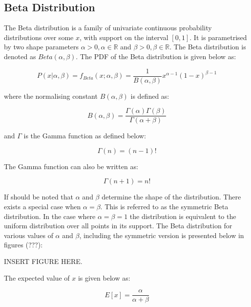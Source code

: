 \subsection{Beta Distribution}
\label{sec:probability:probability_distributions:beta}

The Beta distribution is a family of univariate continuous probability distributions over some $x$, with support on the interval $[0,1]$. It is parametrised by two shape parameters $\alpha > 0, \alpha \in \mathbb{R}$ and $\beta > 0, \beta \in \mathbb{R}$. The Beta distribution is denoted as $Beta(\alpha, \beta)$. The  PDF of the Beta distribution is given below as:

\begin{equation}
P(x | \alpha, \beta) = f_{Beta}(x; \alpha, \beta) = \frac{1}{B(\alpha, \beta)} x^{\alpha - 1} (1 - x)^{\beta - 1}
\end{equation}

where the normalising  constant $B(\alpha, \beta)$ is defined as:

\begin{equation}
B(\alpha, \beta) = \frac{\Gamma(\alpha)\Gamma(\beta)}{\Gamma(\alpha + \beta)}
\end{equation}

and $\Gamma$ is the Gamma function as defined below:

\begin{equation}
\Gamma(n) = ( n - 1)!
\end{equation}

The Gamma function can also be written as:

\begin{equation}
\Gamma(n+1) = n!
\end{equation}

If should be noted that $\alpha$ and $\beta$ determine the shape of the distribution. There exists a special case when $\alpha = \beta$. This is referred to as the symmetric Beta distribution. In the case where $\alpha = \beta = 1$ the distribution is equivalent to the uniform distribution over all points in its support. The Beta distribution for various values of $\alpha$ and $\beta$, including the symmetric version is presented below in figures (???):

INSERT FIGURE HERE.

The expected value of $x$ is given below as:

\begin{equation}
E[x] = \frac{\alpha}{\alpha + \beta}
\end{equation}

